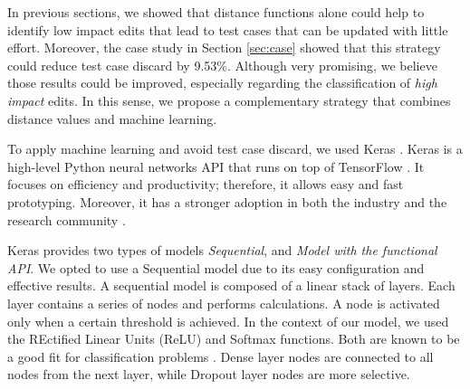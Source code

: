 In previous sections, we showed that distance functions alone could help to identify low impact edits that lead to test cases that can be updated with little effort. Moreover, the case study in Section \ref{sec:case} showed that this strategy could reduce test case discard by 9.53\%. Although very promising, we believe those results could be improved, especially regarding the classification of \textit{high impact }edits. In this sense, we propose a complementary strategy that combines distance values and machine learning.


To apply machine learning and avoid test case discard, we used Keras \citep{gulli2017deep}. Keras is a high-level Python neural networks API that runs on top of TensorFlow \citep{abadi2016tensorflow}. It focuses on efficiency and productivity; therefore, it allows easy and fast prototyping. Moreover, it has a stronger adoption in both the industry and the research community \citep{geron2019hands}.

Keras provides two types of models \textit{Sequential}, and \textit{Model with the functional API}. We opted to use a Sequential model due to its easy configuration and effective results.
A sequential model is composed of a linear stack of layers. Each layer contains a series of nodes and performs calculations. A node is activated only when a certain threshold is achieved. In the context of our model, we used the REctified Linear Units (ReLU) and Softmax functions. Both are known to be a good fit for classification problems \citep{agarap2018deep}. Dense layer nodes are connected to all nodes from the next layer, while Dropout layer nodes are more selective. 

